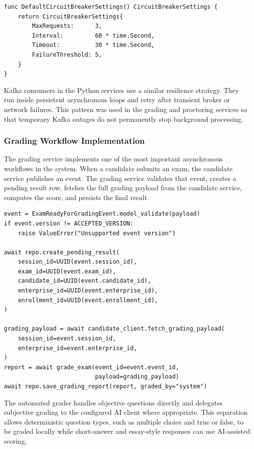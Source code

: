 \begingroup
\footnotesize
\begin{verbatim}
func DefaultCircuitBreakerSettings() CircuitBreakerSettings {
    return CircuitBreakerSettings{
        MaxRequests:      3,
        Interval:         60 * time.Second,
        Timeout:          30 * time.Second,
        FailureThreshold: 5,
    }
}
\end{verbatim}
\endgroup

Kafka consumers in the Python services use a similar resilience strategy. They run inside persistent asynchronous loops and retry after transient broker or network failures. This pattern was used in the grading and proctoring services so that temporary Kafka outages do not permanently stop background processing.

\subsubsection{Grading Workflow Implementation}
The grading service implements one of the most important asynchronous workflows in the system. When a candidate submits an exam, the candidate service publishes an  event. The grading service validates that event, creates a pending result row, fetches the full grading payload from the candidate service, computes the score, and persists the final result.

\begingroup
\footnotesize
\begin{verbatim}
event = ExamReadyForGradingEvent.model_validate(payload)
if event.version != ACCEPTED_VERSION:
    raise ValueError("Unsupported event version")

await repo.create_pending_result(
    session_id=UUID(event.session_id),
    exam_id=UUID(event.exam_id),
    candidate_id=UUID(event.candidate_id),
    enterprise_id=UUID(event.enterprise_id),
    enrollment_id=UUID(event.enrollment_id),
)

grading_payload = await candidate_client.fetch_grading_payload(
    session_id=event.session_id,
    enterprise_id=event.enterprise_id,
)
report = await grade_exam(event_id=event.event_id,
                          payload=grading_payload)
await repo.save_grading_report(report, graded_by="system")
\end{verbatim}
\endgroup

The automated grader handles objective questions directly and delegates subjective grading to the configured AI client where appropriate. This separation allows deterministic question types, such as multiple choice and true or false, to be graded locally while short-answer and essay-style responses can use AI-assisted scoring.


